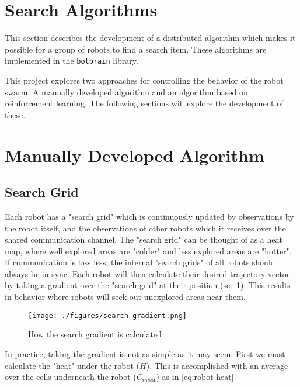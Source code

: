 \section{Search Algorithms}
This section describes the development of a distributed algorithm which makes it possible for a group of robots to find a search item. These algorithms are implemented in the \texttt{botbrain} library.

This project explores two approaches for controlling the behavior of the robot swarm: A {\color{red} manually developed} algorithm and an algorithm based on reinforcement learning. The following sections will explore the development of these.

\section{{\color{red}Manually Developed Algorithm}}

\subsection{Search Grid}

Each robot has a "search grid" which is continuously updated by observations by the robot itself, and the observations of other robots which it receives over the shared communication channel. The "search grid" can be thought of as a heat map, where well explored areas are "colder" and less explored areas are "hotter". If communication is loss less, the internal "search grids" of all robots should always be in sync. Each robot will then calculate their desired trajectory vector by taking a gradient over the "search grid" at their position (see \cref{fig:search-gradient}). This results in behavior where robots will seek out unexplored areas near them.

\begin{figure}[h]
    \begin{center}
        \texttt{[image: ./figures/search-gradient.png]}
    \end{center}
    \caption{How the search gradient is calculated}
    \label{fig:search-gradient}
\end{figure}


In practice, taking the gradient is not as simple as it may seem. First we must calculate the "heat" under the robot ($H$). This is accomplished with an average over the cells underneath the robot ($C_\mathrm{robot}$) as in \cref{eq:robot-heat}.


